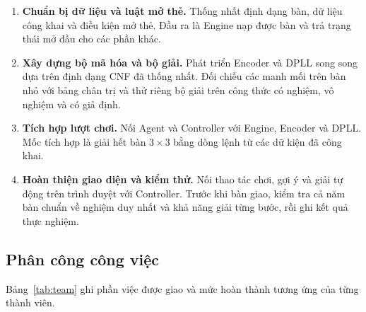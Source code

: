 \documentclass[11pt,a4paper]{article}
\begin{document}
\begin{enumerate}
  \setlength{\itemsep}{1pt}

  \item \textbf{Chuẩn bị dữ liệu và luật mở thẻ.} Thống nhất
  định dạng bàn, dữ liệu công khai và điều kiện mở thẻ. Đầu ra
  là Engine nạp được bàn và trả trạng thái mở đầu cho các phần khác.

  \item \textbf{Xây dựng bộ mã hóa và bộ giải.} Phát triển Encoder
  và DPLL song song dựa trên định dạng CNF đã thống nhất. Đối chiếu
  các manh mối trên bàn nhỏ với bảng chân trị và thử riêng bộ giải
  trên công thức có nghiệm, vô nghiệm và có giả định.

  \item \textbf{Tích hợp lượt chơi.} Nối Agent và Controller với
  Engine, Encoder và DPLL. Mốc tích hợp là giải hết bàn $3\times3$
  bằng dòng lệnh từ các dữ kiện đã công khai.

  \item \textbf{Hoàn thiện giao diện và kiểm thử.} Nối thao tác
  chơi, gợi ý và giải tự động trên trình duyệt với Controller.
  Trước khi bàn giao, kiểm tra cả năm bàn chuẩn về nghiệm duy nhất
  và khả năng giải từng bước, rồi ghi kết quả thực nghiệm.
\end{enumerate}

\subsection{Phân công công việc}

Bảng~\ref{tab:team} ghi phần việc được giao và mức hoàn thành
tương ứng của từng thành viên.

\end{document}
